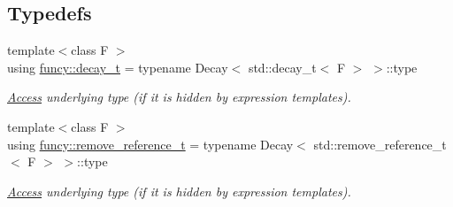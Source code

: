 \subsection*{Typedefs}
\begin{DoxyCompactItemize}
\item 
{\footnotesize template$<$class F $>$ }\\using \hyperlink{namespacefuncy_ab4930ccd94b2ac4d9ee9069453f30c84}{funcy\-::decay\-\_\-t} = typename Decay$<$ std\-::decay\-\_\-t$<$ F $>$ $>$\-::type
\begin{DoxyCompactList}\small\item\em \hyperlink{namespacefuncy_1_1Access}{Access} underlying type (if it is hidden by expression templates). \end{DoxyCompactList}\item 
{\footnotesize template$<$class F $>$ }\\using \hyperlink{namespacefuncy_af445dd811bafa51449c6380536b005c0}{funcy\-::remove\-\_\-reference\-\_\-t} = typename Decay$<$ std\-::remove\-\_\-reference\-\_\-t$<$ F $>$ $>$\-::type
\begin{DoxyCompactList}\small\item\em \hyperlink{namespacefuncy_1_1Access}{Access} underlying type (if it is hidden by expression templates). \end{DoxyCompactList}\end{DoxyCompactItemize}
